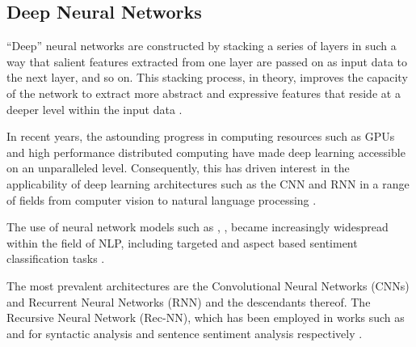 \documentclass[../../fyp.tex]{subfiles}
\begin{document}
\subsection{Deep Neural Networks}
\enquote{Deep} neural networks are constructed by stacking a series of layers in such a way that salient features extracted from one layer are passed on as input data to the next layer, and so on. This stacking process, in theory, improves the capacity of the network to extract more abstract and expressive features that reside at a deeper level within the input data \citep{zhang2018}.

In recent years, the astounding progress in computing resources such as GPUs and high performance distributed computing have made deep learning accessible on an unparalleled level. Consequently, this has driven interest in the applicability of deep learning architectures such as the CNN and RNN in a range of fields from computer vision to natural language processing \citep{goldberg2015,collobert2011}.

The use of neural network models such as \citet{lakkaraju2014}, \citet{vo2015}, \citet{nguyen2015} became increasingly widespread within the field of NLP, including targeted and aspect based sentiment classification tasks \citep{dong,wang,tang2016,tang2016b}.

The most prevalent architectures are the Convolutional Neural Networks (CNNs) and Recurrent Neural Networks (RNN) and the descendants thereof. The Recursive Neural Network (Rec-NN), which has been employed in works such as \citep{socher2011} and \citep{socher2013} for syntactic analysis and sentence sentiment analysis respectively \citep{zhang2018}.


\end{document}

